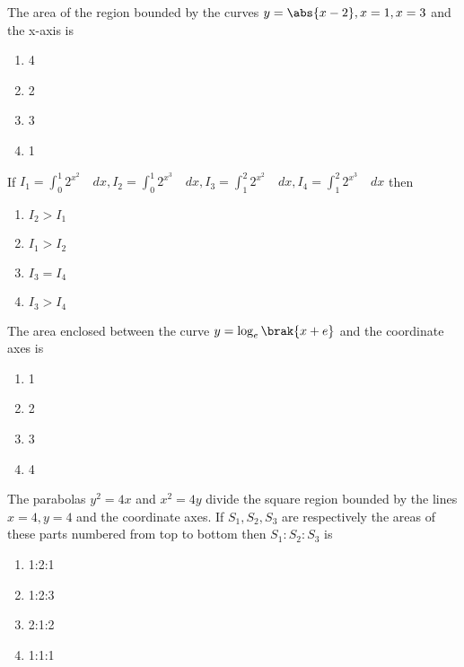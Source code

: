 \iffalse
  \title{Assignment}
  \author{Jakkula Adishesh Balaji}
  \section{mains}
\fi

  \item 
		The area of the region bounded by the curves $y=\abs{x-2}, x=1, x=3$ and the x-axis is \quad \quad \quad
        \quad \quad \hfill {}
		     \begin{enumerate}
		              \item 4
		              \item 2
		              \item 3
		              \item 1
		     \end{enumerate}     
	      \item
           If $I_1=\int_{0}^{1} 2^{x^{2}} \quad dx,I_2=\int_{0}^{1} 2^{x^{3}} \quad dx,I_3=\int_{1}^{2} 2^{x^{2}} \quad dx, I_4=\int_{1}^{2} 2^{x^{3}} \quad dx
          $ then 
          \hfill {} 
          \begin{enumerate}
                   \item $I_2>I_1$
                   \item $I_1>I_2$
                   \item $I_3=I_4$
                   \item $I_3>I_4$
          \end{enumerate}
	      \item
		      The area enclosed between the curve $y=\log_e\brak{x+e}$ and the coordinate  axes is 
		     \hfill {} 
		     \begin{enumerate}
		              \item 1
		              \item 2
		              \item 3
		              \item 4
		     \end{enumerate}
	      \item 
		      The parabolas $y^{2}=4x$ and $x^{2}=4y$ divide the square region bounded by the lines $x=4, y=4$ and the coordinate axes. If $S_1, S_2, S_3$ are respectively the areas of these parts numbered from top to bottom then $S_1:S_2:S_3$ is
		     \hfill {} 
		     \begin{enumerate}
		             \item 1:2:1
		             \item 1:2:3
		             \item 2:1:2
		             \item 1:1:1
		     \end{enumerate}  

